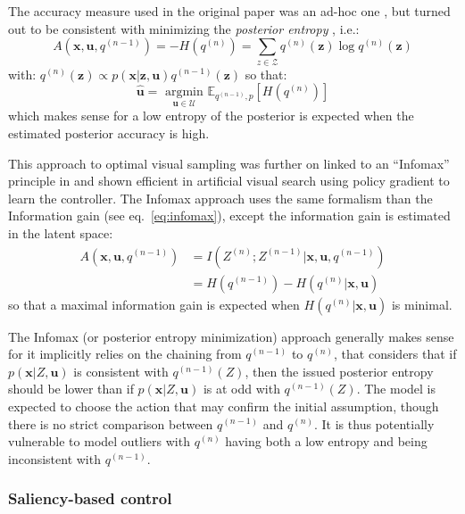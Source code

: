 \documentclass[12pt,twoside,openright]{article}
\begin{document}
The accuracy measure used in the original paper was an ad-hoc one \cite{najemnik2005optimal}, but turned out to be consistent with minimizing the \emph{posterior entropy} \cite{najemnik2009simple}, i.e.:
$$A(\boldsymbol{x}, \boldsymbol{u}, q^{(n-1)}) = -H(q^{(n)}) = \sum_{z \in \mathcal{Z}} q^{(n)}(\boldsymbol{z}) \log q^{(n)}(\boldsymbol{z})$$
with: $q^{(n)}(\boldsymbol{z}) \propto p(\boldsymbol{x|\boldsymbol{z}, \boldsymbol{u}})q^{(n-1)}(\boldsymbol{z}) $
so that:
$$\hat{\boldsymbol{u}} = \underset{\boldsymbol{u} \in \mathcal{U}}{\text{ argmin }} \mathbb{E}_{q^{(n-1)},p}\left[H(q^{(n)})\right] $$ 
which makes sense for a low entropy of the posterior is expected when the estimated posterior accuracy is high.

This approach to optimal visual sampling was further on linked to an ``Infomax'' principle in \cite{butko2010infomax} and shown efficient in artificial visual search using policy gradient \cite{williams1992simple} to learn the controller. The Infomax approach uses the same formalism than the Information gain (see eq.~\ref{eq:infomax}), except the information gain is estimated in the latent space:
\begin{align}
A(\boldsymbol{x}, \boldsymbol{u}, q^{(n-1)}) &= I(Z^{(n)}; Z^{(n-1)}|\boldsymbol{x}, \boldsymbol{u}, q^{(n-1)})\nonumber\\
&= H(q^{(n-1)}) - H(q^{(n)}|\boldsymbol{x}, \boldsymbol{u})
\end{align}
so that a maximal information gain is expected when $H(q^{(n)}|\boldsymbol{x}, \boldsymbol{u})$ is minimal.

The Infomax (or posterior entropy minimization) approach generally makes sense for it implicitly relies on the chaining from $q^{(n-1)}$ to $q^{(n)}$, that considers that if $p(\boldsymbol{x}|Z, \boldsymbol{u})$ is consistent with $q^{(n-1)}(Z)$, then the issued posterior entropy should be lower than if $p(\boldsymbol{x}|Z, \boldsymbol{u})$ is at odd with $q^{(n-1)}(Z)$. The model is expected to choose the action that may confirm the initial assumption, though there is no strict comparison between $q^{(n-1)}$ and $q^{(n)}$.
It is thus potentially vulnerable to model outliers with $q^{(n)}$ having both a low entropy and being inconsistent with $q^{(n-1)}$. 

\subsubsection{Saliency-based control}\label{sec:saliency}
\end{document}
